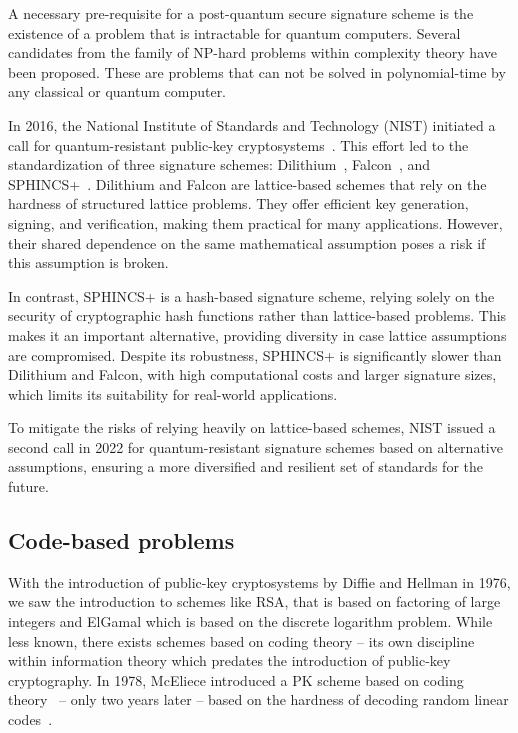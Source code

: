 \documentclass[twoside,11pt]{report}
\theoremstyle{definition}
\theoremstyle{plain}
\begin{document}
A necessary pre-requisite for a post-quantum secure signature scheme is the existence of a problem that is intractable for quantum computers. Several candidates from the family of NP-hard problems within complexity theory have been proposed. These are problems that can not be solved in polynomial-time by any classical or quantum computer.

In 2016, the National Institute of Standards and Technology (NIST) initiated a call for quantum-resistant public-key cryptosystems~\cite{nistcall}. This effort led to the standardization of three signature schemes: Dilithium~\cite{ducas2018crystals}, Falcon~\cite{fouque2018falcon}, and SPHINCS+~\cite{bernstein2019sphincs+}. Dilithium and Falcon are lattice-based schemes that rely on the hardness of structured lattice problems. They offer efficient key generation, signing, and verification, making them practical for many applications. However, their shared dependence on the same mathematical assumption poses a risk if this assumption is broken.

In contrast, SPHINCS+ is a hash-based signature scheme, relying solely on the security of cryptographic hash functions rather than lattice-based problems. This makes it an important alternative, providing diversity in case lattice assumptions are compromised. Despite its robustness, SPHINCS+ is significantly slower than Dilithium and Falcon, with high computational costs and larger signature sizes, which limits its suitability for real-world applications.

To mitigate the risks of relying heavily on lattice-based schemes, NIST issued a second call in 2022 for quantum-resistant signature schemes based on alternative assumptions, ensuring a more diversified and resilient set of standards for the future.


\subsection{Code-based problems}

With the introduction of public-key cryptosystems by Diffie and Hellman in 1976, we saw the introduction to schemes like RSA, that is based on factoring of large integers and ElGamal which is based on the discrete logarithm problem. While less known, there exists schemes based on coding theory -- its own discipline within information theory which predates the introduction of public-key cryptography. In 1978, McEliece introduced a PK scheme based on coding theory~\cite{mceliece1978public} -- only two years later -- based on the hardness of decoding random linear codes~\cite{berlekamp1978inherent}.
\end{document}

